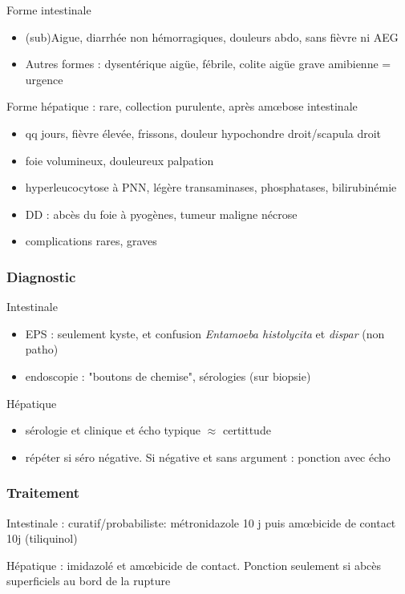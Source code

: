 \documentclass[11pt]{article}
\begin{document}
Forme intestinale 
\begin{itemize}
\item (sub)Aigue, diarrhée non hémorragiques, douleurs abdo, sans fièvre ni AEG
\item Autres formes : dysentérique aigüe, fébrile, colite aigüe grave amibienne
= urgence \faBomb
\end{itemize}

Forme hépatique : rare, collection purulente, après am\oe{}bose intestinale
\begin{itemize}
\item qq jours, fièvre élevée, frissons, douleur hypochondre droit/scapula droit
\item foie volumineux, douleureux palpation
\item hyperleucocytose à PNN, légère \inc{} transaminases, phosphatases,
bilirubinémie
\item DD : abcès du foie à pyogènes, tumeur maligne nécrose
\item complications rares, graves
\end{itemize}

\subsubsection{Diagnostic}
\label{sec:org1f0e171}
Intestinale
\begin{itemize}
\item EPS : seulement kyste, et confusion \emph{Entamoeba histolycita} et \emph{dispar} (non
patho)
\item endoscopie : "boutons de chemise", sérologies (sur biopsie)
\end{itemize}
Hépatique
\begin{itemize}
\item sérologie et clinique et écho typique \(\approx\) certittude
\item répéter si séro négative. Si négative et sans argument : ponction avec écho
\end{itemize}

\subsubsection{Traitement}
\label{sec:org88e1b52}
Intestinale : curatif/probabiliste: métronidazole 10 j puis am\oe{}bicide de
contact 10j (tiliquinol)

Hépatique : imidazolé et am\oe{}bicide de contact. Ponction seulement si abcès superficiels au bord
de la rupture
\end{document}
